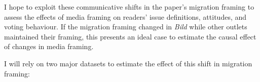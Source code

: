 \documentclass{article}
\begin{document}
I hope to exploit these communicative shifts in the paper's migration framing to assess the effects of media framing on readers' issue definitions, attitudes, and voting behaviour. If the migration framing changed in \textit{Bild} while other outlets maintained their framing, this presents an ideal case to estimate the causal effect of changes in media framing.


I will rely on two major datasets to estimate the effect of this shift in migration framing:
\end{document}
